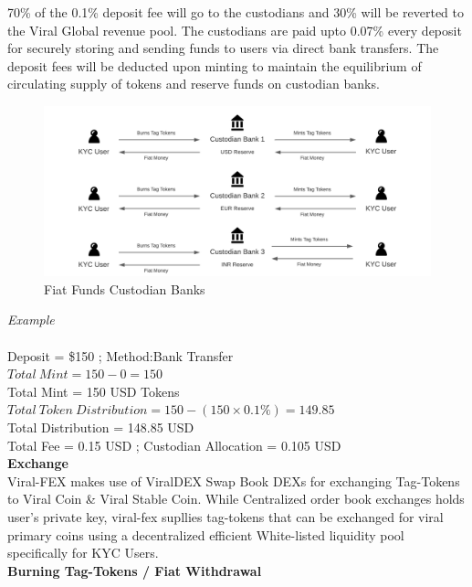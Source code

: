 \documentclass[10pt]{article}
\begin{document}
70\% of the 0.1\% deposit fee will go to the custodians and 30\% will be reverted to the Viral Global revenue pool. The custodians are paid upto 0.07\% every deposit for securely storing and sending funds to users via direct bank transfers. The deposit fees will be deducted upon minting to maintain the equilibrium of circulating supply of tokens and reserve funds on custodian banks.\\

\begin{figure}[H]
\begin{center}
\includegraphics[width=\textwidth]{custodian}
\caption{Fiat Funds Custodian Banks}
\end{center}
\end{figure}

\textit{Example}\\\\
Deposit = \$150 ; Method:Bank Transfer\\
$Total\:Mint=150-0 = 150$\\
Total Mint = 150 USD Tokens\\
$Total\:Token\:Distribution=150-(150 \times 0.1\%)=149.85$\\
Total Distribution = 148.85 USD\\
Total Fee = 0.15 USD ; Custodian Allocation = 0.105 USD\\

\textbf{Exchange}\\

Viral-FEX makes use of ViralDEX Swap Book DEXs for exchanging Tag-Tokens to Viral Coin \& Viral Stable Coin. While Centralized order book exchanges holds user's private key, viral-fex supllies tag-tokens that can be exchanged for viral primary coins using a decentralized efficient White-listed liquidity pool specifically for KYC Users.\\




\textbf{Burning Tag-Tokens / Fiat Withdrawal}\\
\end{document}
